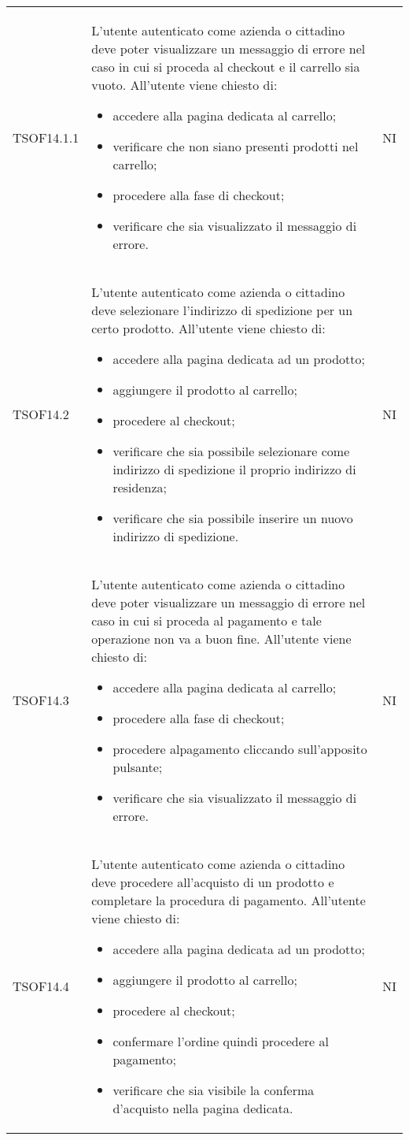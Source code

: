 \begin{longtable}{ >{\centering}p{} >{\centering}p{}
			>{\centering}p{}}
		TSOF14.1.1	&	L'utente autenticato come azienda o cittadino deve poter visualizzare un
		messaggio di errore nel caso in cui si proceda al checkout e il carrello sia
		vuoto. All'utente viene chiesto di:
		\begin{itemize}
			\item accedere alla pagina dedicata al carrello;
			\item verificare che non siano presenti prodotti nel carrello;
			\item procedere alla fase di checkout;
			\item verificare che sia visualizzato il messaggio di errore.
		\end{itemize}	&	NI
		\tabularnewline
		
		TSOF14.2	&	L'utente autenticato come azienda o cittadino deve selezionare l'indirizzo di
		spedizione per un certo prodotto. All'utente viene chiesto di:
		\begin{itemize}
			\item accedere alla pagina dedicata ad un prodotto;
			\item aggiungere il prodotto al carrello;
			\item procedere al checkout;
			\item verificare che sia possibile selezionare come indirizzo di
			spedizione il proprio indirizzo di residenza;
			\item verificare che sia possibile inserire un nuovo indirizzo di
			spedizione.
		\end{itemize}	&	NI
		\tabularnewline
		
		TSOF14.3	&	L'utente autenticato come azienda o cittadino deve poter visualizzare un
		messaggio di errore nel caso in cui si proceda al pagamento e tale operazione non va a buon fine. All'utente viene chiesto di:
		\begin{itemize}
			\item accedere alla pagina dedicata al carrello;
			\item procedere alla fase di checkout;
			\item procedere alpagamento cliccando sull'apposito pulsante;
			\item verificare che sia visualizzato il messaggio di errore.
		\end{itemize}	&	NI
		\tabularnewline
		
		TSOF14.4	&	L'utente autenticato come azienda o cittadino deve procedere all'acquisto di un prodotto e completare la procedura di pagamento. All'utente viene chiesto di:
		\begin{itemize}
			\item accedere alla pagina dedicata ad un prodotto;
			\item aggiungere il prodotto al carrello;
			\item procedere al checkout;
			\item confermare l'ordine quindi procedere al pagamento;
			\item verificare che sia visibile la conferma d'acquisto nella pagina dedicata.
		\end{itemize}	&	NI
		\tabularnewline
		

\end{longtable}
